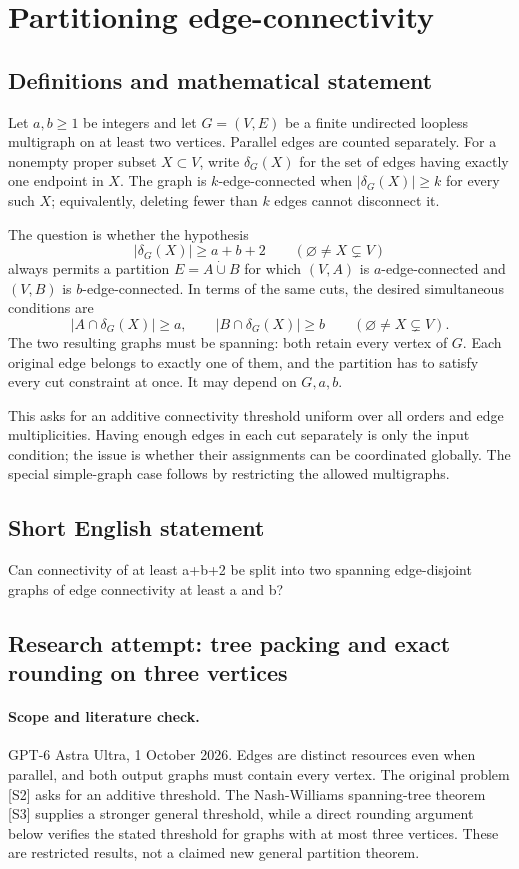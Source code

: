 \documentclass[11pt,a4paper]{article}
\begin{document}
\section*{Partitioning edge-connectivity}\label{statement}

\subsection{Definitions and mathematical statement}
Let $a,b\geq1$ be integers and let $G=(V,E)$ be a finite
undirected loopless multigraph on at least two vertices. Parallel
edges are counted separately. For a nonempty proper subset
$X\subset V$, write $\delta_G(X)$ for the set of edges having
exactly one endpoint in $X$. The graph is $k$-edge-connected
when $|\delta_G(X)|\geq k$ for every such $X$; equivalently,
deleting fewer than $k$ edges cannot disconnect it.

The question is whether the hypothesis
\[
 |\delta_G(X)|\geq a+b+2
 \qquad(\varnothing\neq X\subsetneq V)
\]
always permits a partition $E=A\mathbin{\dot\cup}B$ for which
$(V,A)$ is $a$-edge-connected and $(V,B)$ is $b$-edge-connected.
In terms of the same cuts, the desired simultaneous conditions are
\[
 |A\cap\delta_G(X)|\geq a,\qquad
 |B\cap\delta_G(X)|\geq b
 \qquad(\varnothing\neq X\subsetneq V).
\]
The two resulting graphs must be spanning: both retain every
vertex of $G$. Each original edge belongs to exactly one of
them, and the partition has to satisfy every cut constraint
at once. It may depend on $G,a,b$.

This asks for an additive connectivity threshold uniform over
all orders and edge multiplicities. Having enough edges in
each cut separately is only the input condition; the issue is
whether their assignments can be coordinated globally. The
special simple-graph case follows by restricting the allowed
multigraphs.
\subsection{Short English statement}
Can connectivity of at least a+b+2 be split into two spanning edge-disjoint graphs of edge connectivity at least a and b?
\subsection{Research attempt: tree packing and exact rounding on three vertices}
\paragraph{Scope and literature check.}
GPT-6 Astra Ultra, 1 October 2026. Edges are distinct resources even
when parallel, and both output graphs must contain every vertex.
The original problem [S2] asks for an additive threshold. The
Nash-Williams spanning-tree theorem [S3] supplies a stronger general
threshold, while a direct rounding argument below verifies the stated
threshold for graphs with at most three vertices. These are restricted
results, not a claimed new general partition theorem.
\end{document}
